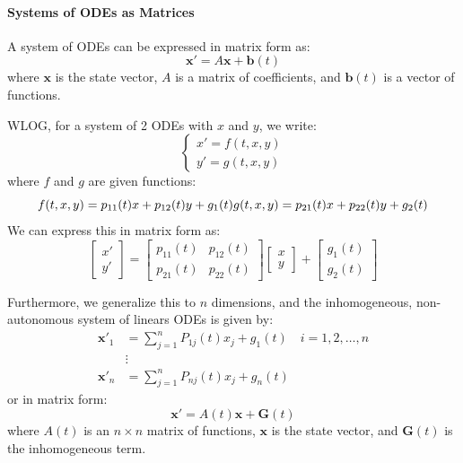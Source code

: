 \documentclass[11pt]{article}
\begin{document}
\paragraph{Systems of ODEs as Matrices}
A system of ODEs can be expressed in matrix form as:
$$\mathbf{x}' = A\mathbf{x} + \mathbf{b}(t)
$$where \( \mathbf{x} \) is the state vector, \( A \) is a matrix of coefficients, and \( \mathbf{b}(t) \) is a vector of functions.

\begin{definition}
    WLOG, for a system of 2 ODEs with $x$ and $y$, we write:
    $$\begin{cases}
    x' = f(t, x, y) \\
    y' = g(t, x, y)
    \end{cases}$$
    where \( f \) and \( g \) are given functions:
    $$
    f(t, x, y) = p_{11}(t)x + p_{12}(t)y + g_1(t) \\
    g(t, x, y) = p_{21}(t)x + p_{22}(t)y + g_2(t)
    $$
    We can express this in matrix form as:
    \begin{equation}
    \begin{bmatrix}x' \\ y'
    \end{bmatrix} = \begin{bmatrix}
    p_{11}(t) & p_{12}(t) \\
    p_{21}(t) & p_{22}(t)
    \end{bmatrix} \begin{bmatrix}x \\ y
    \end{bmatrix} + \begin{bmatrix}g_1(t) \\ g_2(t)
    \end{bmatrix}
    \end{equation}

    Furthermore, we generalize this to \( n \) dimensions, and the inhomogeneous, non-autonomous system of linears ODEs is given by:
    \begin{align*}
    \mathbf{x}'_1 &= \sum^n_{j=1} P_{1j}(t)x_j + g_1(t) \quad i = 1, 2, \ldots, n \\
     & \vdots \\
    \mathbf{x}'_n &= \sum^n_{j=1} P_{nj}(t)x_j + g_n(t)
    \end{align*}
    or in matrix form:
    \begin{equation}
    \mathbf{x}' = A(t)\mathbf{x} + \mathbf{G}(t)
    \end{equation}
    where \( A(t) \) is an \( n \times n \) matrix of functions, \( \mathbf{x} \) is the state vector, and \( \mathbf{G}(t) \) is the inhomogeneous term.
\end{definition}
\end{document}
